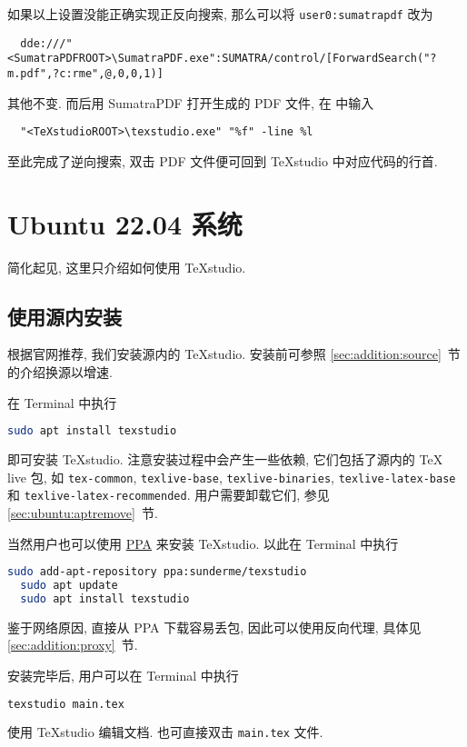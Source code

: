 如果以上设置没能正确实现正反向搜索,
那么可以将 \texttt{user0:sumatrapdf} 改为
\begin{lstlisting}
  dde:///"<SumatraPDFROOT>\SumatraPDF.exe":SUMATRA/control/[ForwardSearch("?m.pdf",?c:rme",@,0,0,1)]
\end{lstlisting}
其他不变.
而后用 SumatraPDF 打开生成的 PDF 文件,
在  中输入
\begin{lstlisting}
  "<TeXstudioROOT>\texstudio.exe" "%f" -line %l
\end{lstlisting}
至此完成了逆向搜索,
双击 PDF 文件便可回到 \TeX studio 中对应代码的行首.

\section{Ubuntu 22.04 系统}\label{sec:editor:ubuntu}

简化起见, 这里只介绍如何使用 \TeX studio.

\subsection{使用源内安装}

根据官网推荐, 我们安装源内的 \TeX studio.
安装前可参照 \ref{sec:addition:source}~节的介绍换源以增速.

在 \textsf{Terminal} 中执行
\begin{lstlisting}[language = bash]
  sudo apt install texstudio
\end{lstlisting}
即可安装 \TeX studio.
注意安装过程中会产生一些依赖, 它们包括了源内的 \TeX{} live 包, 如 \texttt{tex-common}, \texttt{texlive-base}, \texttt{texlive-binaries}, \texttt{texlive-latex-base} 和 \texttt{texlive-latex-recommended}.
用户需要卸载它们,
参见 \ref{sec:ubuntu:aptremove}~节.

当然用户也可以使用
\href{https://code.launchpad.net/~sunderme/+archive/ubuntu/texstudio}{PPA}
来安装 \TeX studio.
以此在 \textsf{Terminal} 中执行
\begin{lstlisting}[language = bash]
  sudo add-apt-repository ppa:sunderme/texstudio
  sudo apt update
  sudo apt install texstudio
\end{lstlisting}
鉴于网络原因,
直接从 PPA 下载容易丢包,
因此可以使用反向代理,
具体见 \ref{sec:addition:proxy}~节.

安装完毕后,
用户可以在 \textsf{Terminal} 中执行
\begin{lstlisting}[language = bash]
  texstudio main.tex
\end{lstlisting}
使用 \TeX studio 编辑文档.
也可直接双击 \texttt{main.tex} 文件.


